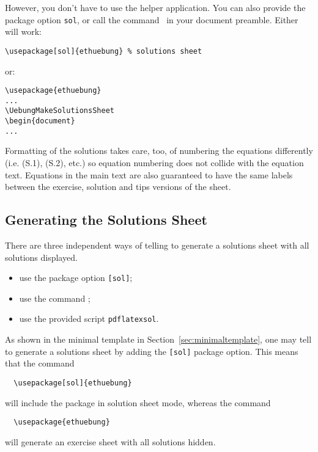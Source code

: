 \documentclass[11pt,a4paper]{article}
\begin{document}
However, you don't have to use the helper application. You can also provide the package
option \texttt{sol}, or call the command~ in your
document preamble. Either will work:
\begin{pkgverbatim}
\begin{verbatim}
\usepackage[sol]{ethuebung} % solutions sheet
\end{verbatim}
\end{pkgverbatim}
or:
\begin{pkgverbatim}
\begin{verbatim}
\usepackage{ethuebung}
...
\UebungMakeSolutionsSheet
\begin{document}
...
\end{verbatim}
\end{pkgverbatim}

Formatting of the solutions takes care, too, of numbering the equations differently
(i.e. (S.1), (S.2), etc.) so equation numbering does not collide with the equation
text. Equations in the main text are also guaranteed to have the same
labels between the exercise, solution and tips versions of the sheet.


\subsection{Generating the Solutions Sheet}
\label{sec:generateSolutions}

There are three independent ways of telling \ethuebung{} to generate a solutions sheet
with all solutions displayed.
\begin{itemize}
\item use the package option \texttt{[sol]};
\item use the command ;
\item use the provided script \texttt{pdflatexsol}.
\end{itemize}

As shown in the minimal template in Section~\ref{sec:minimaltemplate}, one may tell
\ethuebung{} to generate a solutions sheet by adding the \texttt{[sol]} package
option. This means that the command
{\setlength\pkgverbatimoutsidespacing{-3mm}
\begin{pkgverbatim}[-6mm]
\begin{verbatim}
  \usepackage[sol]{ethuebung}
\end{verbatim}
\end{pkgverbatim}}
will include the \ethuebung{} package in solution sheet mode, whereas the command
{\setlength\pkgverbatimoutsidespacing{-3mm}
\begin{pkgverbatim}[-6mm]
\begin{verbatim}
  \usepackage{ethuebung}
\end{verbatim}
\end{pkgverbatim}}
will generate an exercise sheet with all solutions hidden.
\end{document}
